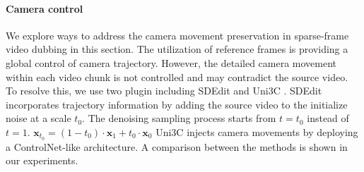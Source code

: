 \paragraph{Camera control}
We explore ways to address the camera movement preservation in sparse-frame video dubbing in this section. The utilization of reference frames is providing a global control of camera trajectory. However, the detailed camera movement within each video chunk is not controlled and may contradict the source video. To resolve this, we use two plugin including SDEdit \cite{sdedit} and Uni3C \cite{cao2025uni3c}. SDEdit incorporates trajectory information by adding the source video to the initialize noise at a scale $t_0$. The denoising sampling process starts from $t= t_0$ instead of $t=1$. $\boldsymbol{x}_{t_0} = (1 - t_0) \cdot \boldsymbol{x}_1 + t_0 \cdot \boldsymbol{x}_0$
Uni3C injects camera movements by deploying a ControlNet-like architecture. A comparison between the methods is shown in our experiments.
